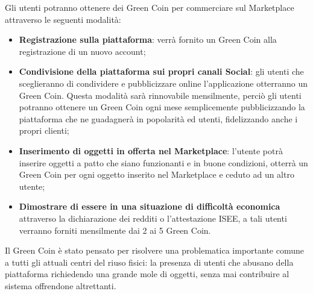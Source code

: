 Gli utenti potranno ottenere dei Green Coin per commerciare sul Marketplace attraverso le seguenti modalità:
\begin{itemize}
    \item \textbf{Registrazione sulla piattaforma}: verrà fornito un Green Coin alla registrazione di un nuovo account;
    \item \textbf{Condivisione della piattaforma sui propri canali Social}: gli utenti che sceglieranno di condividere e pubblicizzare online l'applicazione otterranno un Green Coin. Questa modalità sarà rinnovabile mensilmente, perciò gli utenti potranno ottenere un Green Coin ogni mese semplicemente pubblicizzando la piattaforma che ne guadagnerà in popolarità ed utenti, fidelizzando anche i propri clienti; 
    \item \textbf{Inserimento di oggetti in offerta nel Marketplace}: l'utente potrà inserire oggetti a patto che siano funzionanti e in buone condizioni, otterrà un Green Coin per ogni oggetto inserito nel Marketplace e ceduto ad un altro utente;
    \item \textbf{Dimostrare di essere in una situazione di difficoltà economica} attraverso la dichiarazione dei redditi o l'attestazione ISEE, a tali utenti verranno forniti mensilmente dai 2 ai 5 Green Coin.
\end{itemize}
Il Green Coin è stato pensato per risolvere una problematica importante comune a tutti gli attuali centri del riuso fisici: la presenza di utenti che abusano della piattaforma richiedendo una grande mole di oggetti, senza mai contribuire al sistema offrendone altrettanti. 
\medskip


